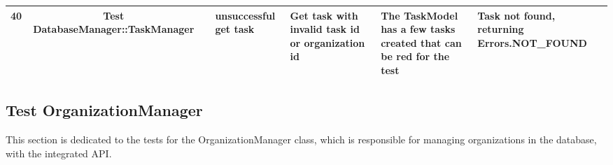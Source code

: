 \documentclass{article}
\begin{document}
{\begin{tabular}{|l|c|l|l|l|l|l|}
    \cellcolor[HTML]{FFFFFF}40                                    & \multirow{-40}{*}{\cellcolor[HTML]{FFFFFF}Test DatabaseManager::TaskManager} & \cellcolor[HTML]{FFFFFF}{\color[HTML]{11734B} Automated}        & unsuccessful get task                          & \cellcolor[HTML]{FFFFFF}Get task with invalid task id or organization id                                                         & \cellcolor[HTML]{FFFFFF}The TaskModel has a few tasks created that can be red for the test     & Task not found, returning Errors.NOT\_FOUND                                                                                   \\ \hline
  \end{tabular}
}

\subsection*{Test OrganizationManager}
This section is dedicated to the tests for the OrganizationManager class, which is responsible for managing organizations in the database, with the integrated API.
\newline
\end{document}
